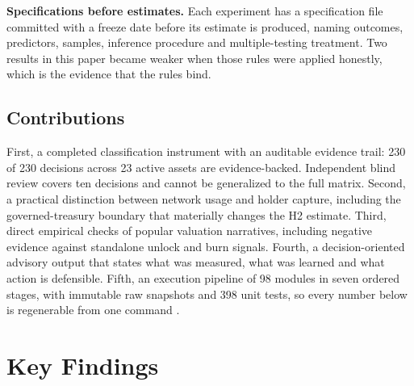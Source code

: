 \documentclass[10pt]{article}
\begin{document}
\textbf{Specifications before estimates.} Each experiment has a specification file committed with a freeze date before its estimate is produced, naming outcomes, predictors, samples, inference procedure and multiple-testing treatment. Two results in this paper became weaker when those rules were applied honestly, which is the evidence that the rules bind.

\subsection{Contributions}
First, a completed classification instrument with an auditable evidence trail: 230 of 230 decisions across 23 active assets are evidence-backed. Independent blind review covers ten decisions and cannot be generalized to the full matrix. Second, a practical distinction between network usage and holder capture, including the governed-treasury boundary that materially changes the H2 estimate. Third, direct empirical checks of popular valuation narratives, including negative evidence against standalone unlock and burn signals. Fourth, a decision-oriented advisory output that states what was measured, what was learned and what action is defensible. Fifth, an execution pipeline of 98 modules in seven ordered stages, with immutable raw snapshots and 398 unit tests, so every number below is regenerable from one command \citep{repo2026}.

\section{Key Findings}
\end{document}
